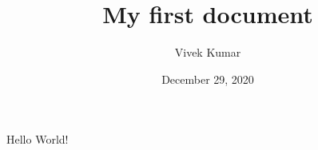 \documentclass{article}
\title{My first document}
\date{December 29, 2020}
\author{Vivek Kumar}
\begin{document}
	
	\maketitle
	\newpage

	Hello World!
\end{document}

